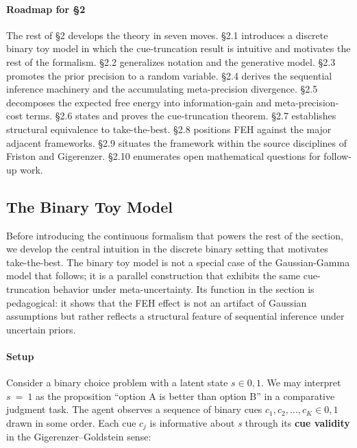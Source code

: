 \documentclass{article}
\begin{document}
\paragraph{Roadmap for \S{}2}\label{roadmap-for-2}

The rest of \S{}2 develops the theory in seven moves. \S{}2.1 introduces a
discrete binary toy model in which the cue-truncation result is
intuitive and motivates the rest of the formalism. \S{}2.2 generalizes
notation and the generative model. \S{}2.3 promotes the prior precision to
a random variable. \S{}2.4 derives the sequential inference machinery and
the accumulating meta-precision divergence. \S{}2.5 decomposes the expected
free energy into information-gain and meta-precision-cost terms. \S{}2.6
states and proves the cue-truncation theorem. \S{}2.7 establishes
structural equivalence to take-the-best. \S{}2.8 positions FEH against the
major adjacent frameworks. \S{}2.9 situates the framework within the source
disciplines of Friston and Gigerenzer. \S{}2.10 enumerates open
mathematical questions for follow-up work.

\subsection{The Binary Toy Model}\label{the-binary-toy-model}

Before introducing the continuous formalism that powers the rest of the
section, we develop the central intuition in the discrete binary setting
that motivates take-the-best. The binary toy model is not a special case
of the Gaussian-Gamma model that follows; it is a parallel construction
that exhibits the same cue-truncation behavior under meta-uncertainty.
Its function in the section is pedagogical: it shows that the FEH effect
is not an artifact of Gaussian assumptions but rather reflects a
structural feature of sequential inference under uncertain priors.

\paragraph{Setup}\label{setup}

Consider a binary choice problem with a latent state \(s \in 0,1\). We
may interpret \(s\  = \ 1\) as the proposition ``option A is better than
option B'' in a comparative judgment task. The agent observes a sequence
of binary cues \(c_{1},c_{2},\ldots,c_{K} \in 0,1\) drawn in some order.
Each cue \(c_{j}\) is informative about \emph{s} through its \textbf{cue
validity} in the Gigerenzer--Goldstein sense:
\end{document}
